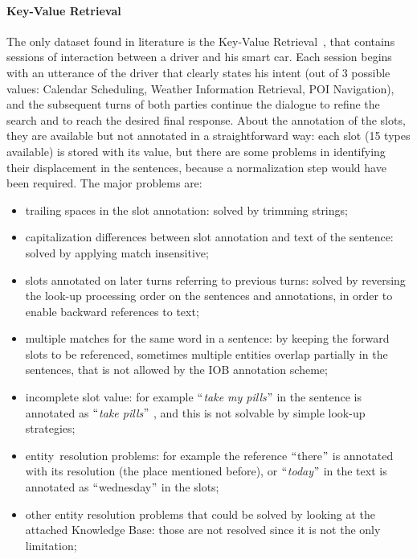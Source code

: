 \paragraph{Key-Value Retrieval}
The only dataset found in literature is the Key-Value Retrieval~\cite{eric2017key}, that contains sessions of interaction between a driver and his smart car. Each session begins with an utterance of the driver that clearly states his intent (out of 3 possible values: Calendar Scheduling, Weather Information Retrieval, POI Navigation), and the subsequent turns of both parties continue the dialogue to refine the search and to reach the desired final response. About the annotation of the slots, they are available but not annotated in a straightforward way: each slot (15 types available) is stored with its value, but there are some problems in identifying their displacement in the sentences, because a normalization step would have been required. The major problems are:

\begin{itemize}
	\item trailing spaces in the slot annotation: solved by trimming strings;

	\item capitalization differences between slot annotation and text of the sentence: solved by applying match insensitive;

	\item slots annotated on later turns referring to previous turns: solved by reversing the look-up processing order on the sentences and annotations, in order to enable backward references to text;

	\item multiple matches for the same word in a sentence: by keeping the forward slots to be referenced, sometimes multiple entities overlap partially in the sentences, that is not allowed by the IOB annotation scheme;

	\item incomplete slot value: for example $``$\textit{take my pills}$"$  in the sentence is annotated as $``$\textit{take pills}$"$ , and this is not solvable by simple look-up strategies;

	\item entity\ resolution problems:  for example the reference $``$there$"$  is annotated with its resolution (the place mentioned before), or $``$\textit{today}$"$  in the text is annotated as $``$wednesday$"$  in the slots;

	\item other entity resolution problems that could be solved by looking at the attached Knowledge Base: those are not resolved since it is not the only limitation;
\end{itemize}

